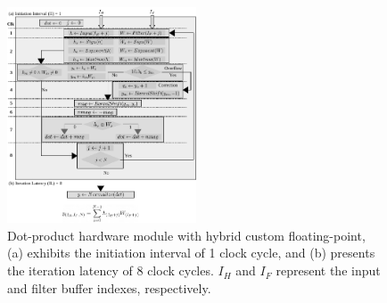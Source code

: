 \begin{figure}[t!]
	\centering
	\includegraphics[width=0.5\textwidth]{../figures/dot_product_hybrid.pdf}
	\caption{Dot-product hardware module with hybrid custom floating-point, (a) exhibits the initiation interval of 1 clock cycle, and (b) presents
		the iteration latency of 8 clock cycles. $I_H$ and $I_F$ represent the input and filter buffer indexes, respectively.}
	\label{fig:dot_product_hybrid}
\end{figure}
